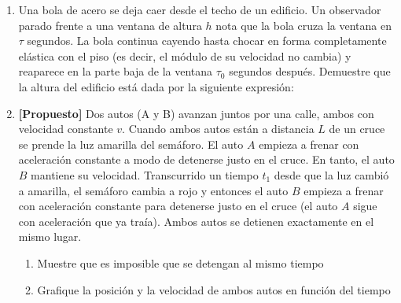 \documentclass[letterpaper,11pt]{article}
\begin{document}
\begin{enumerate}
\begin{figure}[H]
    \centering
    
\end{figure}

\item

{
    \begin{multicols}{2}
        Una bola de acero se deja caer desde el techo de un edificio. Un observador parado frente a una ventana de altura $h$ nota que la bola cruza la ventana en $\tau$ segundos. La bola continua cayendo hasta chocar en forma completamente elástica con el piso (es decir, el módulo de su velocidad no cambia) y reaparece en la parte baja de la ventana $\tau_0$ segundos después. Demuestre que la altura del edificio está dada por la siguiente expresión:
        
        
        \columnbreak
        
        \begin{figure}[H]
            \centering
            
        \end{figure}
        
    \end{multicols}
}

\item \textbf{[Propuesto]} Dos autos (A y B) avanzan juntos por una calle, ambos con velocidad constante $v$. Cuando ambos autos están a distancia $L$ de un cruce se prende la luz amarilla del semáforo. El auto $A$ empieza a frenar con aceleración constante a modo de detenerse justo en el cruce. En tanto, el auto $B$ mantiene su velocidad. Transcurrido un tiempo $t_1$ desde que la luz cambió a amarilla, el semáforo cambia a rojo y entonces el auto $B$ empieza a frenar con aceleración constante para detenerse justo en el cruce (el auto $A$ sigue con aceleración que ya traía). Ambos autos se detienen exactamente en el mismo lugar.

\begin{enumerate}
    \item Muestre que es imposible que se detengan al mismo tiempo
    
    \item Grafique la posición y la velocidad de ambos autos en función del tiempo
\end{enumerate}

%   

\end{enumerate}
\end{document}
